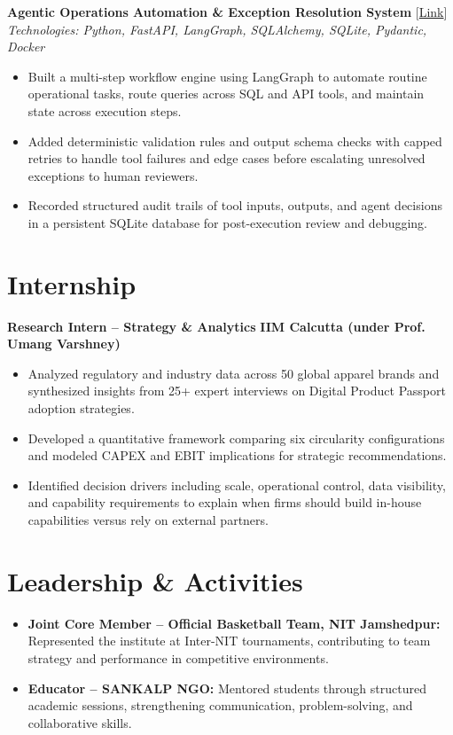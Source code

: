 \documentclass[a4paper,10pt]{article}
\begin{document}
\vspace{1.5pt}

\noindent\textbf{Agentic Operations Automation \& Exception Resolution System} \hfill [\href{https://github.com/roshani-005/Agentic-Operations-Automation-Exception-Resolution-System}{Link}] \\
\textit{Technologies: Python, FastAPI, LangGraph, SQLAlchemy, SQLite, Pydantic, Docker}
\begin{itemize}
    \item Built a multi-step workflow engine using LangGraph to automate routine operational tasks, route queries across SQL and API tools, and maintain state across execution steps.
    \item Added deterministic validation rules and output schema checks with capped retries to handle tool failures and edge cases before escalating unresolved exceptions to human reviewers.
    \item Recorded structured audit trails of tool inputs, outputs, and agent decisions in a persistent SQLite database for post-execution review and debugging.
\end{itemize}

\section*{Internship}
\textbf{Research Intern -- Strategy \& Analytics} \hfill \textbf{IIM Calcutta (under Prof. Umang Varshney)}
\begin{itemize}
    \item Analyzed regulatory and industry data across 50 global apparel brands and synthesized insights from 25+ expert interviews on Digital Product Passport adoption strategies.
    \item Developed a quantitative framework comparing six circularity configurations and modeled CAPEX and EBIT implications for strategic recommendations.
    \item Identified decision drivers including scale, operational control, data visibility, and capability requirements to explain when firms should build in-house capabilities versus rely on external partners.
\end{itemize}

\section*{Leadership \& Activities}
\begin{itemize}
    \item \textbf{Joint Core Member -- Official Basketball Team, NIT Jamshedpur:} Represented the institute at Inter-NIT tournaments, contributing to team strategy and performance in competitive environments.
    \item \textbf{Educator -- SANKALP NGO:} Mentored students through structured academic sessions, strengthening communication, problem-solving, and collaborative skills.
\end{itemize}
\end{document}
